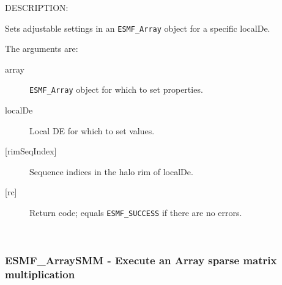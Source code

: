 {\sf DESCRIPTION:\\ }


       Sets adjustable settings in an {\tt ESMF\_Array} object for a specific
       localDe.
  
       The arguments are:
       \begin{description}
       \item [array]
         {\tt ESMF\_Array} object for which to set properties.
       \item [localDe]
         Local DE for which to set values.
       \item[{[rimSeqIndex]}] 
         Sequence indices in the halo rim of localDe.
       \item [{[rc]}]
         Return code; equals {\tt ESMF\_SUCCESS} if there are no errors.
       \end{description}
   
 
\mbox{}\hrulefill\ 
 
\subsubsection [ESMF\_ArraySMM] {ESMF\_ArraySMM - Execute an Array sparse matrix multiplication}


